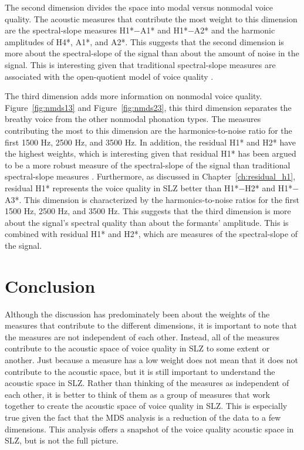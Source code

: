 The second dimension divides the space into modal versus nonmodal voice quality. The acoustic measures that contribute the most weight to this dimension are the spectral-slope measures H1*$-$A1* and H1*$-$A2* and the harmonic amplitudes of H4*, A1*, and A2*. This suggests that the second dimension is more about the spectral-slope of the signal than about the amount of noise in the signal. This is interesting given that traditional spectral-slope measures are associated with the open-quotient model of voice quality \citep{holmbergComparisonsAerodynamicElectroglottographic1995,kreimanMeasuresGlottalSource2007,garellekModelingVoiceSource2016,garellekPhoneticsVoice2019,chaiH1H2Acoustic2022}.

The third dimension adds more information on nonmodal voice quality. Figure~\ref{fig:nmds13} and Figure~\ref{fig:nmds23}, this third dimension separates the breathy voice from the other nonmodal phonation types. The measures contributing the most to this dimension are the harmonics-to-noise ratio for the first 1500 Hz, 2500 Hz, and 3500 Hz. In addition, the residual H1* and H2* have the highest weights, which is interesting given that residual H1* has been argued to be a more robust measure of the spectral-slope of the signal than traditional spectral-slope measures \citep{chaiH1H2Acoustic2022,brinkerhoffResidualH1Measure2024}. Furthermore, as discussed in Chapter~\ref{ch:residual_h1}, residual H1* represents the voice quality in SLZ better than H1*$-$H2* and H1*$-$A3*. This dimension is characterized by the harmonics-to-noise ratios for the first 1500 Hz, 2500 Hz, and 3500 Hz. This suggests that the third dimension is more about the signal's spectral quality than about the formants' amplitude. This is combined with residual H1* and H2*, which are measures of the spectral-slope of the signal.

\section{Conclusion} \label{sec:acousticlandscape:conclusion}

Although the discussion has predominately been about the weights of the measures that contribute to the different dimensions, it is important to note that the measures are not independent of each other. Instead, all of the measures contribute to the acoustic space of voice quality in SLZ to some extent or another. Just because a measure has a low weight does not mean that it does not contribute to the acoustic space, but it is still important to understand the acoustic space in SLZ. Rather than thinking of the measures as independent of each other, it is better to think of them as a group of measures that work together to create the acoustic space of voice quality in SLZ. This is especially true given the fact that the MDS analysis is a reduction of the data to a few dimensions. This analysis offers a snapshot of the voice quality acoustic space in SLZ, but is not the full picture. 

